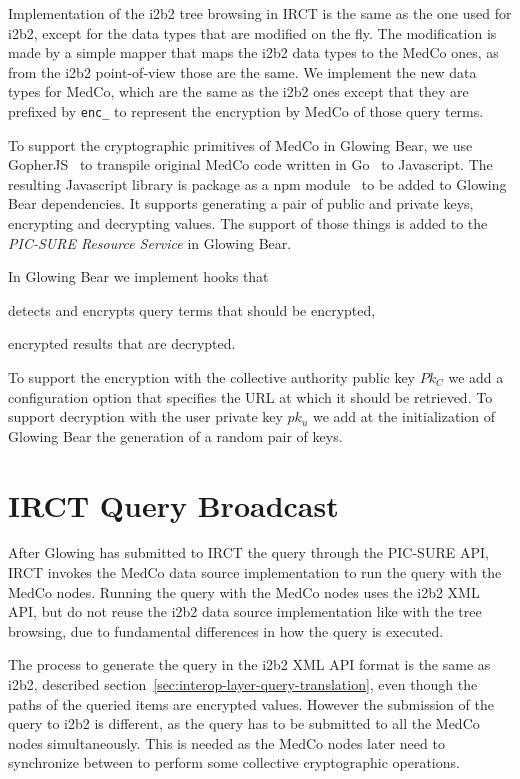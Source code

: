 Implementation of the i2b2 tree browsing in IRCT is the same as the one used for i2b2, except for the data types that are modified on the fly.
The modification is made by a simple mapper that maps the i2b2 data types to the MedCo ones, as from the i2b2 point-of-view those are the same.
We implement the new data types for MedCo, which are the same as the i2b2 ones except that they are prefixed by \verb|enc_| to represent the encryption by MedCo of those query terms.

To support the cryptographic primitives of MedCo in Glowing Bear, we use GopherJS~\cite{todo} to transpile original MedCo code written in Go~\cite{todo} to Javascript.
The resulting Javascript library is package as a npm module~\cite{todo} to be added to Glowing Bear dependencies.
It supports generating a pair of public and private keys, encrypting and decrypting values.
The support of those things is added to the \emph{PIC-SURE Resource Service} in Glowing Bear.

In Glowing Bear we implement hooks that 
\begin{enumerate*}
    \item detects and encrypts query terms that should be encrypted,
    \item encrypted results that are decrypted.
\end{enumerate*}
To support the encryption with the collective authority public key $Pk_C$ we add a configuration option that specifies the URL at which it should be retrieved.
To support decryption with the user private key $pk_u$ we add at the initialization of Glowing Bear the generation of a random pair of keys.


\section{IRCT Query Broadcast}

After Glowing has submitted to IRCT the query through the PIC-SURE API, IRCT invokes the MedCo data source implementation to run the query with the MedCo nodes.
Running the query with the MedCo nodes uses the i2b2 XML API, but do not reuse the i2b2 data source implementation like with the tree browsing, due to fundamental differences in how the query is executed.

The process to generate the query in the i2b2 XML API format is the same as i2b2, described section~\ref{sec:interop-layer-query-translation}, even though the paths of the queried items are encrypted values.
However the submission of the query to i2b2 is different, as the query has to be submitted to all the MedCo nodes simultaneously.
This is needed as the MedCo nodes later need to synchronize between to perform some collective cryptographic operations.


